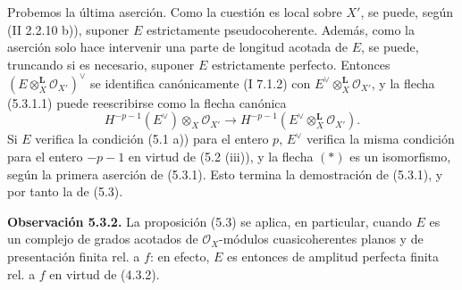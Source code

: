 Probemos la última aserción. Como la cuestión es local sobre \(X'\), se puede, según (II 2.2.10 b)), suponer \(E\) estrictamente pseudocoherente. Además, como la aserción solo hace intervenir una parte de longitud acotada de \(E\), se puede, truncando si es necesario, suponer \(E\) estrictamente perfecto. Entonces \((E\otimes_X^{\mathbf L}\mathcal O_{X'})^{\vee}\) se identifica canónicamente (I 7.1.2) con \(E^{\vee}\otimes_X^{\mathbf L}\mathcal O_{X'}\), y la flecha (5.3.1.1) puede reescribirse como la flecha canónica
\begin{equation}
 H^{-p-1}(E^{\vee})\otimes_X\mathcal O_{X'}\longrightarrow H^{-p-1}(E^{\vee}\otimes_X^{\mathbf L}\mathcal O_{X'}).\tag{$*$}
\end{equation}
Si \(E\) verifica la condición (5.1 a)) para el entero \(p\), \(E^{\vee}\) verifica la misma condición para el entero \(-p-1\) en virtud de (5.2 (iii)), y la flecha \((*)\) es un isomorfismo, según la primera aserción de (5.3.1). Esto termina la demostración de (5.3.1), y por tanto la de (5.3).

\textbf{Observación 5.3.2.} La proposición (5.3) se aplica, en particular, cuando \(E\) es un complejo de grados acotados de \(\mathcal O_X\)-módulos cuasicoherentes planos y de presentación finita rel. a \(f\): en efecto, \(E\) es entonces de amplitud perfecta finita rel. a \(f\) en virtud de (4.3.2).
